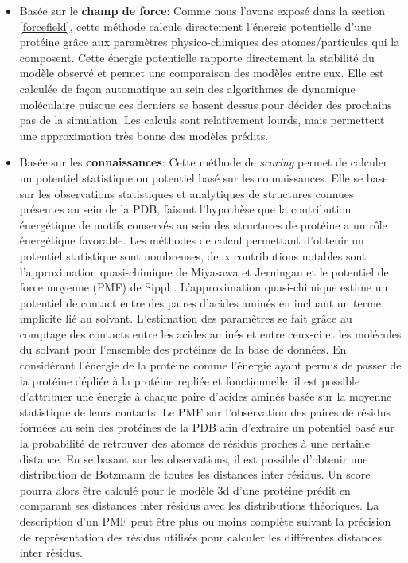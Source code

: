 \begin{itemize}
	\item Basée sur le \textbf{champ de force}: Comme nous l'avons exposé dans la section \ref{forcefield}, cette méthode calcule directement l'énergie potentielle d'une protéine grâce aux paramètres physico-chimiques des atomes/particules qui la composent. Cette énergie potentielle rapporte directement la stabilité du modèle observé et permet une comparaison des modèles entre eux. Elle est calculée de façon automatique au sein des algorithmes de dynamique moléculaire puisque ces derniers se basent dessus pour décider des prochains pas de la simulation. Les calculs sont relativement lourds, mais permettent une approximation très bonne des modèles prédits.
	\item Basée sur les \textbf{connaissances}: Cette méthode de \textit{scoring} permet de calculer un potentiel statistique ou potentiel basé sur les connaissances. Elle se base sur les observations statistiques et analytiques de structures connues présentes au sein de la PDB, faisant l'hypothèse que la contribution énergétique de motifs conservés au sein des structures de protéine a un rôle énergétique favorable. Les méthodes de calcul permettant d'obtenir un potentiel statistique sont nombreuses, deux contributions notables sont l'approximation quasi-chimique de Miyasawa et Jerningan \cite{miyazawa1985estimation} et le potentiel de force moyenne (PMF) de Sippl \cite{sippl1990calculation}. L'approximation quasi-chimique estime un potentiel de contact entre des paires d'acides aminés en incluant un terme implicite lié au solvant. L'estimation des paramètres se fait grâce au comptage des contacts entre les acides aminés et entre ceux-ci et les molécules du solvant pour l'ensemble des protéines de la base de données. En considérant l'énergie de la protéine comme l'énergie ayant permis de passer de la protéine dépliée à la protéine repliée et fonctionnelle, il est possible d'attribuer une énergie à chaque paire d'acides aminés basée sur la moyenne statistique de leurs contacts. Le PMF sur l'observation des paires de résidus formées au sein des protéines de la PDB afin d'extraire un potentiel basé sur la probabilité de retrouver des atomes de résidus proches à une certaine distance. En se basant sur les observations, il est possible d'obtenir une distribution de Botzmann de toutes les distances inter résidus. Un score pourra alors être calculé pour le modèle 3d d'une protéine prédit en comparant ses distances inter résidus avec les distributions théoriques. La description d'un PMF peut être plus ou moins complète suivant la précision de représentation des résidus utilisés pour calculer les différentes distances inter résidus.
\end{itemize}

